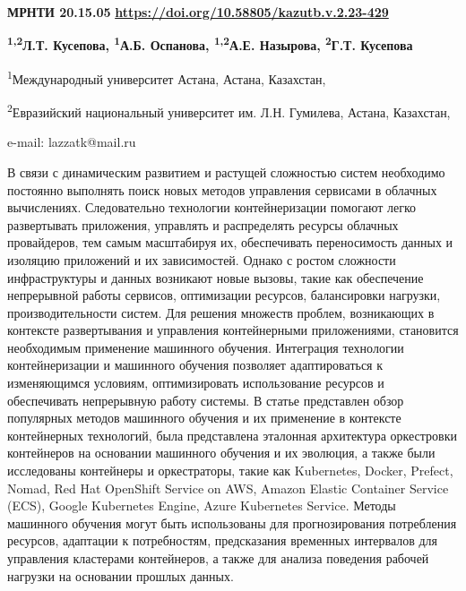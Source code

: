 \newpage
{\bfseries МРНТИ 20.15.05}
\hfill {\bfseries \href{https://doi.org/10.58805/kazutb.v.2.23-429}{https://doi.org/10.58805/kazutb.v.2.23-429}}


\begin{center}
{\bfseries \textsuperscript{1,2}Л.Т. Кусепова\envelope, \textsuperscript{1}А.Б.
Оспанова, \textsuperscript{1,2}А.Е. Назырова, \textsuperscript{2}Г.Т.
Кусепова}

\textsuperscript{1}Международный университет Астана, Астана, Казахстан,

\textsuperscript{2}Евразийский национальный университет им. Л.Н.
Гумилева, Астана, Казахстан,

e-mail: lazzatk@mail.ru
\end{center}

В связи с динамическим развитием и растущей сложностью систем необходимо
постоянно выполнять поиск новых методов управления сервисами в облачных
вычислениях. Следовательно технологии контейнеризации помогают легко
развертывать приложения, управлять и распределять ресурсы облачных
провайдеров, тем самым масштабируя их, обеспечивать переносимость данных
и изоляцию приложений и их зависимостей. Однако с ростом сложности
инфраструктуры и данных возникают новые вызовы, такие как обеспечение
непрерывной работы сервисов, оптимизации ресурсов, балансировки
нагрузки, производительности систем. Для решения множеств проблем,
возникающих в контексте развертывания и управления контейнерными
приложениями, становится необходимым применение машинного обучения.
Интеграция технологии контейнеризации и машинного обучения позволяет
адаптироваться к изменяющимся условиям, оптимизировать использование
ресурсов и обеспечивать непрерывную работу системы. В статье представлен
обзор популярных методов машинного обучения и их применение в контексте
контейнерных технологий, была представлена эталонная архитектура
оркестровки контейнеров на основании машинного обучения и их эволюция, а
также были исследованы контейнеры и оркестраторы, такие как Kubernetes,
Docker, Prefect, Nomad, Red Hat OpenShift Service on AWS, Amazon Elastic
Container Service (ECS), Google Kubernetes Engine, Azure Kubernetes
Service. Методы машинного обучения могут быть использованы для
прогнозирования потребления ресурсов, адаптации к потребностям,
предсказания временных интервалов для управления кластерами контейнеров,
а также для анализа поведения рабочей нагрузки на основании прошлых
данных.

